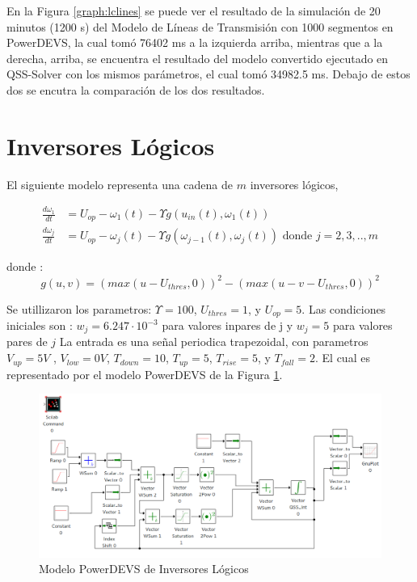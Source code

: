 En la Figura \ref{graph:lclines} se puede ver el resultado de la simulación de 20 minutos (1200 s) del Modelo de Líneas de Transmisión con 1000 segmentos en PowerDEVS,
	la cual tomó 76402 ms a la izquierda arriba, mientras que a la derecha, arriba, se encuentra el resultado del modelo convertido ejecutado en QSS-Solver con los mismos parámetros, el cual tomó 34982.5 ms. Debajo de estos dos se encutra la comparación de los dos resultados.

\section{Inversores Lógicos}
	El siguiente modelo representa una cadena de $m$ inversores lógicos, 

\begin{align*}
\frac{d \omega_1}{d t} & = U_{op} - \omega_1(t) - \Upsilon g (u_{in}(t), \omega_{1} (t))    \\
\frac{d \omega_j}{d t} & = U_{op} - \omega_j(t) - \Upsilon g (\omega_{j-1}(t), \omega_{j} (t)) \textrm{ donde $j = 2, 3, .., m$}
\end{align*}

donde :
\begin{equation*}
	g(u, v) = (max(u - U_{thres} , 0))^2 - (max (u - v - U_{thres} , 0))^2
\end{equation*}

Se utillizaron los parametros: $\Upsilon = 100$,  $U_{thres} = 1$, y $U_{op} = 5$.
Las condiciones iniciales son : $w_j = 6.247 \cdot 10^{-3}$ para valores inpares de j y $w_j = 5$ para valores pares de $j$
La entrada es una señal periodica trapezoidal, con parametros 
$V_{up} = 5V$ , $V_{low} = 0V$, $T_{down} = 10$, $T_{up} = 5$, $T_{rise} = 5$, y $T_{fall} = 2$.
El cual es representado por el modelo PowerDEVS de la Figura \ref{model:inverters}.

\begin{figure}[H]
\includegraphics[width=0.75\linewidth]{inverters}
\caption{Modelo PowerDEVS de Inversores Lógicos}\label{model:inverters}
\end{figure}

